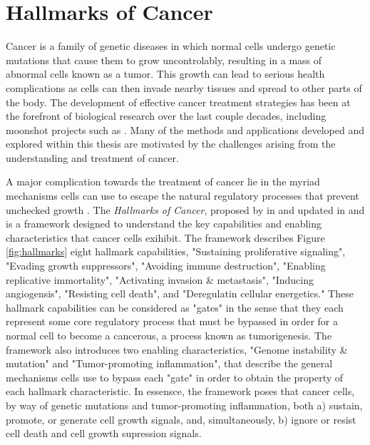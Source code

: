 \section{Hallmarks of Cancer}
Cancer is a family of genetic diseases in which normal cells undergo genetic mutations that cause them to grow uncontrolably, resulting in a mass of abnormal cells known as a tumor.
This growth can lead to serious health complications as cells
can then invade nearby tissues and spread to other parts of the body.
The development of effective cancer treatment strategies has been at the forefront of biological research over the last couple decades, including moonshot projects such as \cite{need}. %
Many of the methods and applications developed and explored within this thesis are motivated by the challenges arising from the understanding and treatment of cancer.

A major complication towards the treatment of cancer lie in the myriad mechanisms cells can use to escape the natural regulatory processes that prevent unchecked growth \cite{need}.
The \emph{Hallmarks of Cancer}, proposed by \citeauthor{foo} in \citeyear{foo} and updated in \citeyear{foo} and \citeyear{foo} is a framework designed to understand the key capabilities and enabling characteristics that cancer cells exihibit.
The framework describes Figure \ref{fig:hallmarks} eight hallmark capabilities,
"Sustaining proliferative signaling", 
"Evading growth suppressors",
"Avoiding immune destruction",
"Enabling replicative immortality",
"Activating invasion \& metastasis",
"Inducing angiogensis",
"Resisting cell death",
and "Deregulatin cellular energetics."
These hallmark capabilities can be considered as "gates" in the sense that they each represent some core regulatory process that must be bypassed in order for a normal cell to become a cancerous, a process known as tumorigenesis. %
The framework also introduces two enabling characteristics, "Genome instability \& mutation" and "Tumor-promoting inflammation", that describe the general mechanisms cells use to bypass each "gate" in order to obtain the property of each hallmark characteristic.
In essensce, the framework poses that cancer cells, by way of genetic mutations and tumor-promoting inflammation, both
a) sustain, promote, or generate cell growth signals, and, simultaneously,
b) ignore or resist cell death and cell growth supression signals.

